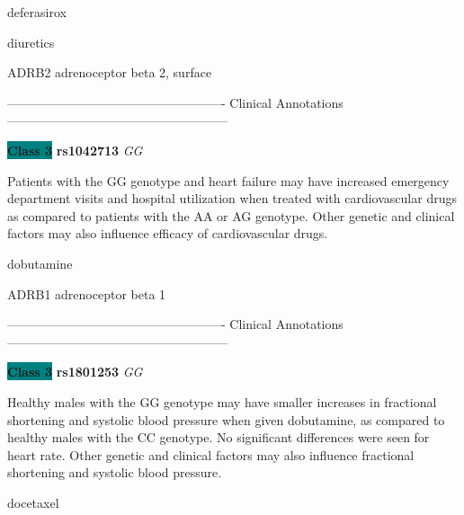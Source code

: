 \documentclass{resume} %
\begin{document}
\begin{rSection}{ deferasirox }
\end{rSection}\begin{rSection}{ diuretics }
\item[]

\begin{rSubsection}{ ADRB2 }{ adrenoceptor beta 2, surface }{}{}
\item[]

\item[] ---------------------------------------------------- Clinical Annotations -----------------------------------------------------\newline
\item \textbf{\colorbox{teal} {Class 3}} \textbf{ rs1042713 } \textit{ GG }
\item[] Patients with the GG genotype and heart failure may have increased emergency department visits and hospital utilization when treated with cardiovascular drugs as compared to patients with the AA or AG genotype. Other genetic and clinical factors may also influence efficacy of cardiovascular drugs.
\end{rSubsection}

\end{rSection}\begin{rSection}{ dobutamine }
\item[]

\begin{rSubsection}{ ADRB1 }{ adrenoceptor beta 1 }{}{}
\item[]

\item[] ---------------------------------------------------- Clinical Annotations -----------------------------------------------------\newline
\item \textbf{\colorbox{teal} {Class 3}} \textbf{ rs1801253 } \textit{ GG }
\item[] Healthy males with the GG genotype may have smaller increases in fractional shortening and systolic blood pressure when given dobutamine, as compared to healthy males with the CC genotype. No significant differences were seen for heart rate. Other genetic and clinical factors may also influence fractional shortening and systolic blood pressure.
\end{rSubsection}

\end{rSection}\begin{rSection}{ docetaxel }
\item[]


\end{rSection}
\end{document}
